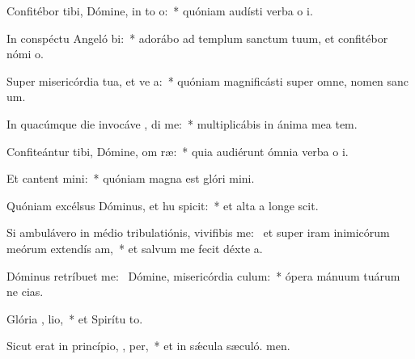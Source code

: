 \item Confitébor tibi, Dómine, in to  o:~* quóniam audísti verba o i.
\item In conspéctu Angeló  bi:~* adorábo ad templum sanctum tuum, et confitébor nómi o.
\item Super misericórdia tua, et ve a:~* quóniam magnificásti super omne, nomen sanc um.
\item In quacúmque die invocáve , di me:~* multiplicábis in ánima mea tem.
\item Confiteántur tibi, Dómine, om  ræ:~* quia audiérunt ómnia verba o i.
\item Et cantent   mini:~* quóniam magna est glóri mini.
\item Quóniam excélsus Dóminus, et hu spicit:~* et alta a longe scit.
\item Si ambulávero in médio tribulatiónis, vivifibis me:~\pscross{} et super iram inimicórum meórum extendís  am,~* et salvum me fecit déxte a.
\item Dóminus retríbuet  me:~\pscross{} Dómine, misericórdia   culum:~* ópera mánuum tuárum ne cias.
\item Glória ,  lio,~* et Spirítu to.
\item Sicut erat in princípio,  ,  per,~* et in sǽcula sæculó. men.
